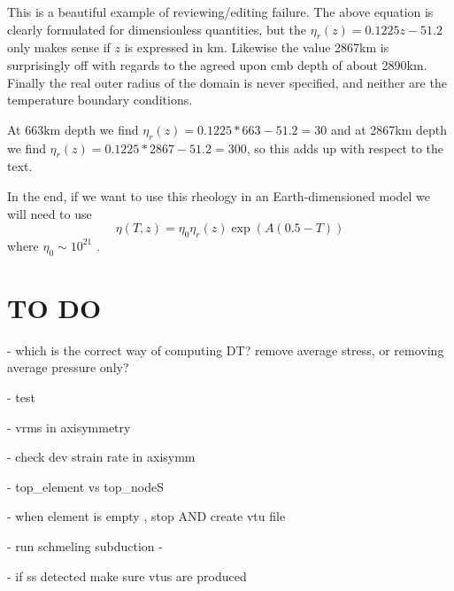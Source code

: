 \documentclass[a4paper,12pt]{article}
\begin{document}
This is a beautiful example of reviewing/editing failure. The above equation 
is clearly formulated for dimensionless quantities, but the $\eta_r(z)=0.1225z-51.2$
only makes sense if $z$ is expressed in km. 
Likewise the value 2867km is surprisingly off with regards to the agreed upon 
cmb depth of about 2890km. Finally the real outer radius of the domain is never specified, 
and neither are the temperature boundary conditions.

At 663km depth we find $\eta_r(z)=0.1225*663-51.2=30$ 
and at 2867km depth we find $\eta_r(z)=0.1225*2867-51.2=300$, so this adds 
up with respect to the text.

In the end, if we want to use this rheology in an Earth-dimensioned model
we will need to use
\[
\eta(T,z) = \eta_0 \eta_r(z) \exp (A(0.5-T))
\]
where $\eta_0\sim 10^{21}$ .


\section{TO DO}

- which is the correct way of computing DT? remove average stress, or removing average pressure only?

- test

- vrms in axisymmetry

- check dev strain rate in axisymm 
 
- top\_element vs top\_nodeS

- when element is empty , stop AND create vtu file 

- run schmeling subduction - 

- if ss detected make sure vtus are produced 




\newpage
\printbibliography
\end{document}
